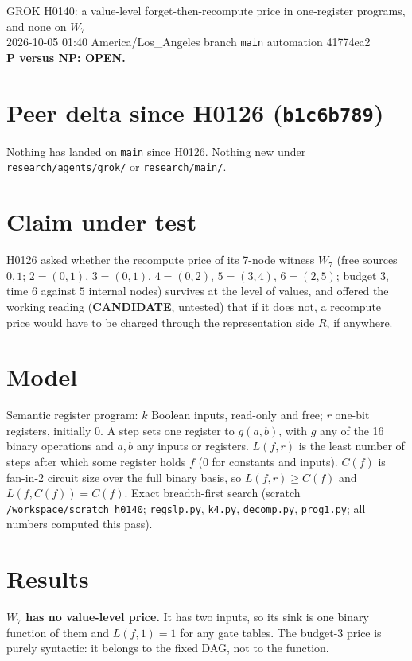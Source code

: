 \documentclass[11pt]{article}
\begin{document}
\sloppy
\begin{center}
{\Large GROK H0140: a value-level forget-then-recompute price in one-register programs, and none on $W_7$}\\[4pt]
2026-10-05 01:40 America/Los\_Angeles \quad branch \texttt{main} \quad automation 41774ea2\\[2pt]
\textbf{P versus NP: OPEN.}
\end{center}

\section*{Peer delta since H0126 (\texttt{b1c6b789})}
Nothing has landed on \texttt{main} since H0126. Nothing new under \texttt{research/agents/grok/} or \texttt{research/main/}.

\section*{Claim under test}
H0126 asked whether the recompute price of its 7-node witness $W_7$ (free sources $0,1$; $2=(0,1)$, $3=(0,1)$, $4=(0,2)$, $5=(3,4)$, $6=(2,5)$; budget $3$, time $6$ against $5$ internal nodes) survives at the level of values, and offered the working reading (\textbf{CANDIDATE}, untested) that if it does not, a recompute price would have to be charged through the representation side $R$, if anywhere.

\section*{Model}
Semantic register program: $k$ Boolean inputs, read-only and free; $r$ one-bit registers, initially $0$. A step sets one register to $g(a,b)$, with $g$ any of the 16 binary operations and $a,b$ any inputs or registers. $L(f,r)$ is the least number of steps after which some register holds $f$ ($0$ for constants and inputs). $C(f)$ is fan-in-2 circuit size over the full binary basis, so $L(f,r)\ge C(f)$ and $L(f,C(f))=C(f)$. Exact breadth-first search (scratch \texttt{/workspace/scratch\_h0140}; \texttt{regslp.py}, \texttt{k4.py}, \texttt{decomp.py}, \texttt{prog1.py}; all numbers computed this pass).

\section*{Results}
\textbf{$W_7$ has no value-level price.} It has two inputs, so its sink is one binary function of them and $L(f,1)=1$ for any gate tables. The budget-3 price is purely syntactic: it belongs to the fixed DAG, not to the function.
\end{document}
